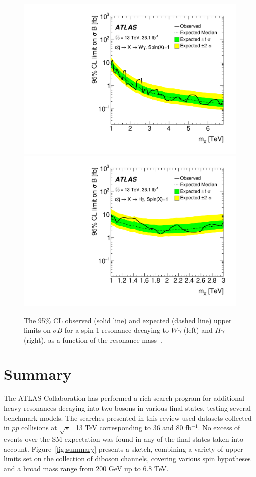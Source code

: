 \documentclass{PoS}
\begin{document}
 \begin{figure}
     \includegraphics[width=.5\textwidth]{figures/lim_Wg_qqA1}
     \includegraphics[width=.5\textwidth]{figures/lim_Hg_qqA1}
     \caption{The 95\% CL observed (solid line) and expected (dashed line) upper limits on $\sigma B$ for a spin-1 resonance decaying to $W\gamma$ (left) and $H\gamma$ (right), as a function of the resonance mass~\cite{EXOT-2016-30}.}
     \label{fig:Wg_lim}
     \end{figure}

\vspace*{-10mm}
\section{Summary}
\label{sec:sum}

The ATLAS Collaboration has performed a rich search program for additional heavy resonances decaying into two bosons in various final states, testing several benchmark models.
The searches presented in this review used datasets collected in $pp$ collisions at $\sqrt{s}$=13 TeV corresponding to 36 and 80 fb$^{-1}$.
No excess of events over the SM expectation was found in any of the final states taken into account. 
Figure~\ref{fig:summary} presents a sketch, combining a variety of upper limits set on the collection of diboson channels, covering various spin hypotheses and a broad mass range from 200 GeV up to 6.8 TeV.
\end{document}
